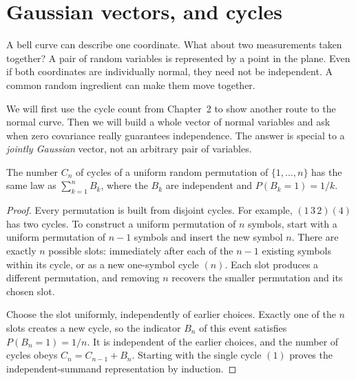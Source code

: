 \section{Gaussian vectors, and cycles}

A bell curve can describe one coordinate. What about two measurements taken together? A pair of random variables is represented by a point in the plane. Even if both coordinates are individually normal, they need not be independent. A common random ingredient can make them move together.

We will first use the cycle count from Chapter~2 to show another route to the normal curve. Then we will build a whole vector of normal variables and ask when zero covariance really guarantees independence. The answer is special to a \emph{jointly Gaussian} vector, not an arbitrary pair of variables.

\begin{proposition}\label{prop:cyclebern}
The number $C_n$ of cycles of a uniform random permutation of $\{1,\ldots,n\}$ has the same law as $\sum_{k=1}^n B_k$, where the $B_k$ are independent and $P(B_k=1)=1/k$.
\end{proposition}
\begin{proof}
Every permutation is built from disjoint cycles. For example, $(1\,3\,2)(4)$ has two cycles. To construct a uniform permutation of $n$ symbols, start with a uniform permutation of $n-1$ symbols and insert the new symbol $n$. There are exactly $n$ possible slots: immediately after each of the $n-1$ existing symbols within its cycle, or as a new one-symbol cycle $(n)$. Each slot produces a different permutation, and removing $n$ recovers the smaller permutation and its chosen slot.

Choose the slot uniformly, independently of earlier choices. Exactly one of the $n$ slots creates a new cycle, so the indicator $B_n$ of this event satisfies $P(B_n=1)=1/n$. It is independent of the earlier choices, and the number of cycles obeys $C_n=C_{n-1}+B_n$. Starting with the single cycle $(1)$ proves the independent-summand representation by induction.
\end{proof}


